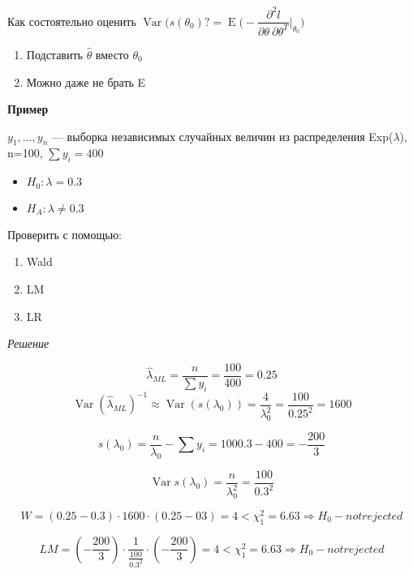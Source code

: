 \documentclass[12pt]{article} %
\theoremstyle{definition} %
\DeclareMathOperator{\Var}{Var}
\DeclareMathOperator{\E}{E}
\def \htheta{\hat{\theta}}
\def \hlambda{\hat{\lambda}}
\begin{document}
\newpage
Как состоятельно оценить $\Var (s(\theta_0) ? =\E \Big(-\dfrac{\partial^2 l}{\partial \theta \: \partial \theta^T}\Big\rvert_{\theta_0} \Big)$
\begin{enumerate}
    \item Подставить $\htheta$ вместо $\theta_0$
    \item Можно даже не брать E
\end{enumerate}

\bigskip
\textbf{Пример}

    $y_1, ..., y_n$ --- выборка независимых случайных величин из распределения Exp($\lambda$), n=100, $\sum y_i = 400$
\medskip    
\begin{itemize}
    \item $H_0: \lambda = 0.3$
    \item $H_A: \lambda \neq 0.3$
\end{itemize}

Проверить с помощью:
\medskip    
\begin{enumerate}

    \item Wald
    \item LM
    \item LR
\end{enumerate}

\medskip    
\emph{Решение}

\begin{equation}
   \hlambda_{ML} = \dfrac{n}{\sum y_i} = \dfrac{100}{400} = 0.25
  \end{equation} 
\begin{equation}
   \Var (\hlambda_{ML})^{-1} \approx \Var (s(\lambda_0)) = \dfrac{4}{\lambda_0^2} = \dfrac{100}{0.25^2} = 1600
  \end{equation} 
  
\begin{equation}
   s(\lambda_0) = \dfrac{n}{\lambda_0} - \sum y_i = {100}{0.3} - 400 = -\dfrac{200}{3}
  \end{equation} 

\begin{equation}
   \Var s(\lambda_0) = \dfrac{n}{\lambda_0^2} = \dfrac{100}{0.3^2}
  \end{equation}   
  

\begin{equation}
   W = (0.25-0.3)\cdot 1600 \cdot (0.25-03) = 4 < \chi_1^2 = 6.63 \Rightarrow H_0 - not rejected
  \end{equation}
  
\begin{equation}
   LM = (-\dfrac{200}{3}) \cdot \dfrac{1}{\frac{100}{0.3^2}} \cdot (-\dfrac{200}{3}) = 4 < \chi_1^2 = 6.63 \Rightarrow H_0 - not rejected
  \end{equation}
  
\end{document}
